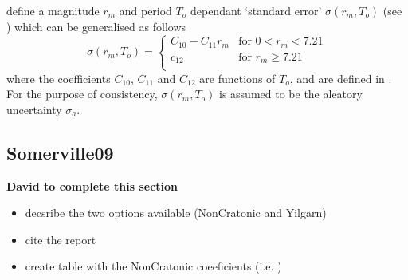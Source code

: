 \cite{dr_Sadigh97a} define a magnitude $r_m$ and period $T_o$
dependant `standard error' $\sigma(r_m,T_o)$ (see \citealt[Table
3]{dr_Sadigh97a}) which can be generalised as follows
\begin{equation}
\sigma(r_m,T_o) = \left \{ \begin{array}{ll}
C_{10}-C_{11}r_m & \textrm{for $0<r_m<7.21$} \\
c_{12} & \textrm{for $r_m \geq 7.21$} \\
\end{array} \right.
\end{equation}
where the coefficients $C_{10}$, $C_{11}$ and $C_{12}$ are functions
of $T_o$, and are defined in \cite[Table A-14]{dr_Campbell03a}. For
the purpose of consistency, $\sigma(r_m,T_o)$ is assumed to be the
aleatory uncertainty $\sigma_a$.


\subsection{Somerville09}
\textbf{David to complete this section}
\begin{itemize}
\item decsribe the two options available (NonCratonic and Yilgarn)
\item cite the report
\item create table with the NonCratonic coeeficients (i.e.
)
\end{itemize}


